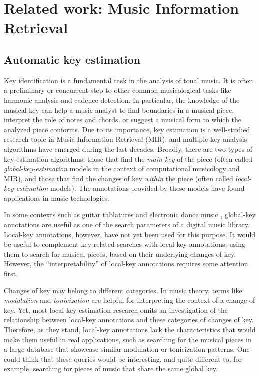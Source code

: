 \chapter{Related work: Music Information Retrieval}
\label{chap:chap2}


\section{Automatic key estimation}

Key identification is a fundamental task in the analysis of tonal music. 
It is often a preliminary or concurrent step to other common musicological tasks like harmonic analysis and cadence detection. 
In particular, the knowledge of the musical key can help a music analyst to find boundaries in a musical piece, interpret the role of notes and chords, or suggest a musical form to which the analyzed piece conforms.
Due to its importance, key estimation is a well-studied research topic in Music Information Retrieval (MIR), and multiple key-analysis algorithms have emerged during the last decades. 
Broadly, there are two types of key-estimation algorithms: those that find the \emph{main key} of the piece (often called \emph{global-key-estimation} models in the context of computational musicology and MIR), and those that find the changes of key \emph{within} the piece (often called \emph{local-key-estimation} models). The annotations provided by these models have found applications in music technologies.

In some contexts such as guitar tablatures \cite{ultimateguitar} and electronic dance music \cite{beatport}, global-key annotations are useful as one of the search parameters of a digital music library. 
Local-key annotations, however, have not yet been used for this purpose. 
It would be useful to complement key-related searches with local-key annotations, using them to search for musical pieces, based on their underlying changes of key. 
However, the ``interpretability'' of local-key annotations requires some attention first. 

Changes of key may belong to different categories. 
In music theory, terms like \emph{modulation} and \emph{tonicization} are helpful for interpreting the context of a change of key. 
Yet, most local-key-estimation research omits an investigation of the relationship between local-key annotations and these categories of changes of key. 
Therefore, as they stand, local-key annotations lack the characteristics that would make them useful in real applications, such as searching for the musical pieces in a large database that showcase similar modulation or tonicization patterns. 
One could think that these queries would be interesting, and quite different to, for example, searching for pieces of music that share the same global key. 

